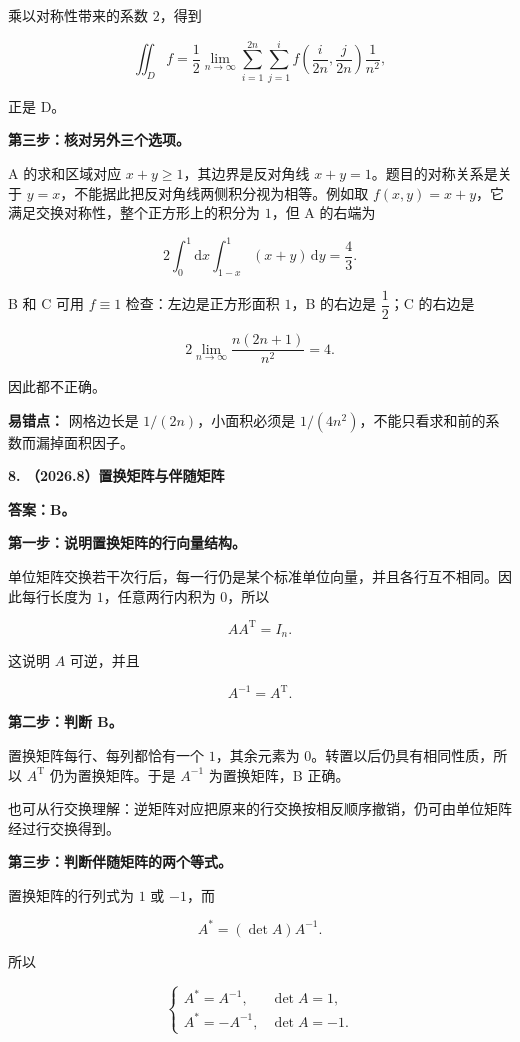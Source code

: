\documentclass[UTF8,11pt,fontset=windows]{ctexart}
\begin{document}
乘以对称性带来的系数 $2$，得到

$$
\iint_Df
=\frac12\lim_{n\to\infty}\sum_{i=1}^{2n}\sum_{j=1}^{i}
 f\left(\frac{i}{2n},\frac{j}{2n}\right)\frac1{n^2},
$$

正是 D。

\textbf{第三步：核对另外三个选项。}

A 的求和区域对应 $x+y\ge1$，其边界是反对角线 $x+y=1$。题目的对称关系是关于 $y=x$，不能据此把反对角线两侧积分视为相等。例如取 $f(x,y)=x+y$，它满足交换对称性，整个正方形上的积分为 $1$，但 A 的右端为

$$
2\int_0^1\mathrm{d}x\int_{1-x}^1(x+y)\,\mathrm{d}y=\frac43.
$$

B 和 C 可用 $f\equiv1$ 检查：左边是正方形面积 $1$，B 的右边是 $\dfrac12$；C 的右边是

$$
2\lim_{n\to\infty}\frac{n(2n+1)}{n^2}=4.
$$

因此都不正确。

\textbf{易错点：} 网格边长是 $1/(2n)$，小面积必须是 $1/(4n^2)$，不能只看求和前的系数而漏掉面积因子。

\clearpage

\textbf{8. （2026.8）置换矩阵与伴随矩阵}

\textbf{答案：B。}

\textbf{第一步：说明置换矩阵的行向量结构。}

单位矩阵交换若干次行后，每一行仍是某个标准单位向量，并且各行互不相同。因此每行长度为 $1$，任意两行内积为 $0$，所以

$$
AA^{\mathrm T}=I_n.
$$

这说明 $A$ 可逆，并且

$$
A^{-1}=A^{\mathrm T}.
$$

\textbf{第二步：判断 B。}

置换矩阵每行、每列都恰有一个 $1$，其余元素为 $0$。转置以后仍具有相同性质，所以 $A^{\mathrm T}$ 仍为置换矩阵。于是 $A^{-1}$ 为置换矩阵，B 正确。

也可从行交换理解：逆矩阵对应把原来的行交换按相反顺序撤销，仍可由单位矩阵经过行交换得到。

\textbf{第三步：判断伴随矩阵的两个等式。}

置换矩阵的行列式为 $1$ 或 $-1$，而

$$
A^*=(\det A)A^{-1}.
$$

所以

$$
\begin{cases}
A^*=A^{-1},&\det A=1,\\
A^*=-A^{-1},&\det A=-1.
\end{cases}
$$
\end{document}
